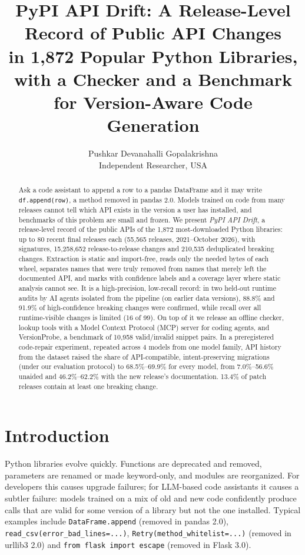 \documentclass[10pt,twocolumn,letterpaper]{article}
\title{\Large\bfseries PyPI API Drift: A Release-Level Record of Public API Changes\\in 1,872 Popular Python Libraries, with a Checker and a Benchmark\\for Version-Aware Code Generation}
\author{Pushkar Devanahalli Gopalakrishna\\Independent Researcher, USA}
\date{}
\begin{document}
\maketitle

\begin{abstract}
Ask a code assistant to append a row to a pandas DataFrame and it may write \texttt{df.append(row)}, a method removed
in pandas 2.0. Models trained on code from many releases cannot tell which API exists in the version a user has
installed, and benchmarks of this problem are small and frozen. We present \emph{PyPI API Drift}, a release-level
record of the public APIs of the 1,872 most-downloaded Python libraries: up to 80 recent final releases each
(55,565 releases, 2021--October 2026), with signatures, 15,258,652 release-to-release changes and
210,535 deduplicated breaking changes. Extraction is static and import-free, reads only the
needed bytes of each wheel, separates names that were truly removed from names that merely left the documented API,
and marks with confidence labels and a coverage layer where static analysis cannot see. It is a high-precision,
low-recall record: in two held-out runtime audits by AI agents isolated from the pipeline (on earlier data versions),
88.8\% and 91.9\% of high-confidence breaking changes were confirmed, while recall over all runtime-visible changes is limited (16 of
99). On top of it we release an offline checker, lookup tools with a Model Context Protocol (MCP) server for coding agents, and
VersionProbe, a benchmark of 10,958 valid/invalid snippet pairs. In a preregistered code-repair experiment,
repeated across 4 models from one model family, API history from the dataset raised the share of API-compatible,
intent-preserving migrations (under our evaluation protocol) to 68.5\%--69.9\% for every model, from
7.0\%--56.6\% unaided and 46.2\%--62.2\% with the new release's documentation.
13.4\% of patch releases contain at least one breaking change.
\end{abstract}

\section{Introduction}
Python libraries evolve quickly. Functions are deprecated and removed, parameters are renamed or made
keyword-only, and modules are reorganized. For developers this causes upgrade failures; for LLM-based code
assistants it causes a subtler failure: models trained on a mix of old and new code confidently produce calls that
are valid for some version of a library but not the one installed. Typical examples include
\texttt{DataFrame.append} (removed in pandas 2.0), \texttt{read\_csv(error\_bad\_lines=...)},
\texttt{Retry(method\_whitelist=...)} (removed in urllib3 2.0) and \texttt{from flask import escape} (removed in
Flask 3.0).
\end{document}
